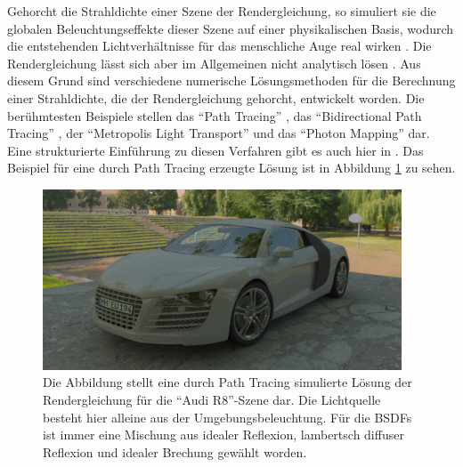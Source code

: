 		Gehorcht die Strahldichte einer Szene der Rendergleichung, so simuliert sie die globalen Beleuchtungseffekte dieser Szene auf einer physikalischen Basis, wodurch die entstehenden Lichtverhältnisse für das menschliche Auge real wirken \cite{kajiya-lte,pbrt3,veach-thesis}.
		Die Rendergleichung lässt sich aber im Allgemeinen nicht analytisch lösen \cite{pbrt3,veach-thesis,kajiya-lte}.
		Aus diesem Grund sind verschiedene numerische Lösungsmethoden für die Berechnung einer Strahldichte, die der Rendergleichung gehorcht, entwickelt worden.
		Die berühmtesten Beispiele stellen das \enquote{Path Tracing} \cite{kajiya-lte}, das \enquote{Bidirectional Path Tracing} \cite{bidirectional-path-tracing}, der \enquote{Metropolis Light Transport} \cite{veach-mlt} und das \enquote{Photon Mapping} \cite{course-photon-map} dar.
		Eine strukturierte Einführung zu diesen Verfahren gibt es auch hier in \cite{pbrt3}.
		Das Beispiel für eine durch Path Tracing erzeugte Lösung ist in Abbildung \ref{fig:example-audi-r8-pt} zu sehen.

		\begin{figure}[h]
			\center
			\includegraphics[width=0.95\textwidth]{pic/example-audi_r8-pt.png}
			\caption[\enquote{Audi R8}-Szene als Beispiel für die Lösung der Rendergleichung durch Path Tracing]{Die Abbildung stellt eine durch Path Tracing simulierte Lösung der Rendergleichung für die \enquote{Audi R8}-Szene dar. Die Lichtquelle besteht hier alleine aus der Umgebungsbeleuchtung. Für die BSDFs ist immer eine Mischung aus idealer Reflexion, lambertsch diffuser Reflexion und idealer Brechung gewählt worden.}
			\label{fig:example-audi-r8-pt}
		\end{figure}

